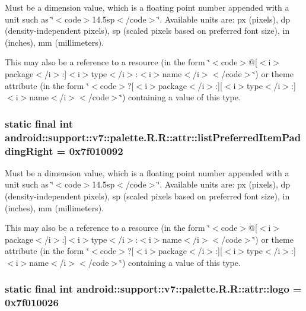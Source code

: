 Must be a dimension value, which is a floating point number appended with a unit such as \char`\"{}$<$code$>$14.5sp$<$/code$>$\char`\"{}. Available units are: px (pixels), dp (density-independent pixels), sp (scaled pixels based on preferred font size), in (inches), mm (millimeters). 

This may also be a reference to a resource (in the form \char`\"{}$<$code$>$@\mbox{[}$<$i$>$package$<$/i$>$:\mbox{]}$<$i$>$type$<$/i$>$:$<$i$>$name$<$/i$>$$<$/code$>$\char`\"{}) or theme attribute (in the form \char`\"{}$<$code$>$?\mbox{[}$<$i$>$package$<$/i$>$:\mbox{]}\mbox{[}$<$i$>$type$<$/i$>$:\mbox{]}$<$i$>$name$<$/i$>$$<$/code$>$\char`\"{}) containing a value of this type. \hypertarget{classandroid_1_1support_1_1v7_1_1palette_1_1_r_1_1attr_aa958a8ae582ba7b0ef7928b86c0144f}{
\subsubsection[{listPreferredItemPaddingRight}]{\setlength{\rightskip}{0pt plus 5cm}static final int android::support::v7::palette.R.R::attr::listPreferredItemPaddingRight = 0x7f010092}}
\label{classandroid_1_1support_1_1v7_1_1palette_1_1_r_1_1attr_aa958a8ae582ba7b0ef7928b86c0144f}


Must be a dimension value, which is a floating point number appended with a unit such as \char`\"{}$<$code$>$14.5sp$<$/code$>$\char`\"{}. Available units are: px (pixels), dp (density-independent pixels), sp (scaled pixels based on preferred font size), in (inches), mm (millimeters). 

This may also be a reference to a resource (in the form \char`\"{}$<$code$>$@\mbox{[}$<$i$>$package$<$/i$>$:\mbox{]}$<$i$>$type$<$/i$>$:$<$i$>$name$<$/i$>$$<$/code$>$\char`\"{}) or theme attribute (in the form \char`\"{}$<$code$>$?\mbox{[}$<$i$>$package$<$/i$>$:\mbox{]}\mbox{[}$<$i$>$type$<$/i$>$:\mbox{]}$<$i$>$name$<$/i$>$$<$/code$>$\char`\"{}) containing a value of this type. \hypertarget{classandroid_1_1support_1_1v7_1_1palette_1_1_r_1_1attr_a8bd2f59c7567314fed38f5ac9e0a7fd}{
\subsubsection[{logo}]{\setlength{\rightskip}{0pt plus 5cm}static final int android::support::v7::palette.R.R::attr::logo = 0x7f010026}}
\label{classandroid_1_1support_1_1v7_1_1palette_1_1_r_1_1attr_a8bd2f59c7567314fed38f5ac9e0a7fd}


